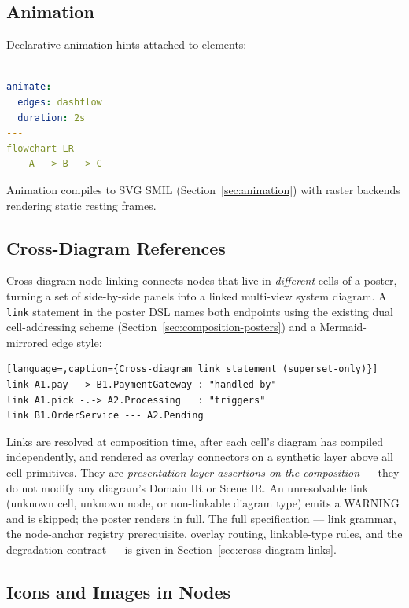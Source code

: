\subsection{Animation}

Declarative animation hints attached to elements:

\begin{lstlisting}[language=yaml,caption={Animation extension}]
---
animate:
  edges: dashflow
  duration: 2s
---
flowchart LR
    A --> B --> C
\end{lstlisting}

Animation compiles to SVG SMIL (Section~\ref{sec:animation}) with raster backends
rendering static resting frames.

\subsection{Cross-Diagram References}

Cross-diagram node linking connects nodes that live in \emph{different} cells
of a poster, turning a set of side-by-side panels into a linked multi-view
system diagram.  A \texttt{link} statement in the poster DSL names both
endpoints using the existing dual cell-addressing scheme
(Section~\ref{sec:composition-posters}) and a Mermaid-mirrored edge style:

\begin{lstlisting}[language=,caption={Cross-diagram link statement (superset-only)}]
link A1.pay --> B1.PaymentGateway : "handled by"
link A1.pick -.-> A2.Processing   : "triggers"
link B1.OrderService --- A2.Pending
\end{lstlisting}

Links are resolved at composition time, after each cell's diagram has compiled
independently, and rendered as overlay connectors on a synthetic layer above
all cell primitives.  They are \emph{presentation-layer assertions on the
composition} --- they do not modify any diagram's Domain IR or Scene IR.  An
unresolvable link (unknown cell, unknown node, or non-linkable diagram type)
emits a WARNING and is skipped; the poster renders in full.  The full
specification --- link grammar, the node-anchor registry prerequisite, overlay
routing, linkable-type rules, and the degradation contract --- is given in
Section~\ref{sec:cross-diagram-links}.

\subsection{Icons and Images in Nodes}

